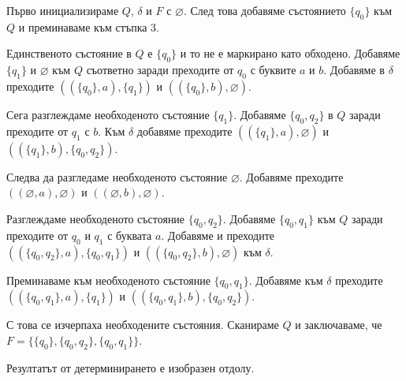 \documentclass{article}
\begin{document}
    Първо инициализираме $Q$, $\delta$ и $F$ с $\varnothing$. След това добавяме състоянието
    $\{q_0\}$ към $Q$ и преминаваме към стъпка 3. \\

    \vspace{5pt}

    Единственото състояние в $Q$ е $\{q_0\}$ и то не е маркирано като обходено. 
    Добавяме $\{q_1\}$ и $\varnothing$ към $Q$ съответно заради преходите от $q_0$ с
    буквите $a$ и $b$. Добавяме в $\delta$ преходите $((\{q_0\},a),\{q_1\})$ и 
    $((\{q_0\},b),\varnothing)$.\\

    \vspace{5pt}

    Сега разглеждаме необходеното състояние $\{q_1\}$. Добавяме $\{q_0,q_2\}$ в $Q$
    заради преходите от $q_1$ с $b$. Към $\delta$ добавяме преходите
    $((\{q_1\},a),\varnothing)$ и \\
    $((\{q_1\},b),\{q_0,q_2\})$.

    \vspace{5pt}

    Следва да разгледаме необходеното състояние $\varnothing$. Добавяме преходите
    $((\varnothing,a),\varnothing)$ и $((\varnothing,b),\varnothing)$.

    \vspace{5pt}

    Разглеждаме необходеното състояние $\{q_0,q_2\}$. Добавяме $\{q_0,q_1\}$ към
    $Q$ заради преходите от $q_0$ и $q_1$ с буквата $a$. Добавяме и преходите \\ 
    $((\{q_0,q_2\},a),\{q_0,q_1\})$ и $((\{q_0,q_2\},b),\varnothing)$ към $\delta$.

    \vspace{5pt}

    Преминаваме към необходеното състояние $\{q_0,q_1\}$. Добавяме към $\delta$
    преходите $((\{q_0,q_1\},a),\{q_1\})$ и $((\{q_0,q_1\},b),\{q_0,q_2\})$.

    \vspace{5pt}

    С това се изчерпаха необходените състояния. Сканираме $Q$ и заключаваме, че
    $F = \{\{q_0\},\{q_0,q_2\},\{q_0,q_1\}\}$.

    \vspace{5pt}

    Резултатът от детерминирането е изобразен отдолу.
\end{document}
